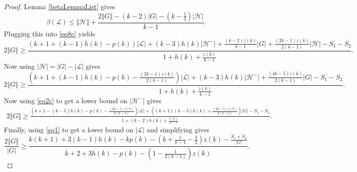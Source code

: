 \documentclass[10pt]{article}
\theoremstyle{plain}
\theoremstyle{definition}
\theoremstyle{remark}
\newcommand{\fancy}[1]{\mathcal{#1}}
\renewcommand{\L}{\fancy{L}}
\newcommand{\HH}{\fancy{H}}
\newcommand{\card}[1]{\left|#1\right|}
\newcommand{\size}[1]{\left\Vert#1\right\Vert}
\newcommand{\parens}[1]{\left( #1 \right)}
\begin{document}
\begin{proof}
Lemma \ref{betaLemmaList} gives
\[\beta(\L) \le \size{\HH} + \frac{2\size{G} - (k-2)\card{G} - \parens{k - \frac12}\card{\HH}}{k-1}.\]
Plugging this into \eqref{eq8c} yields
\begin{equation}\label{eq9c}
2\size{G} \ge \frac{\parens{k+1 +(k-1)h(k)- p(k)}\card{\L} + (k- 3)h(k)\card{\HH^-} +\frac{(k-2)z(k)}{k-1}\card{G} + \frac{(2k-1)z(k)}{2(k-1)}\card{\HH} - S_1 - S_2}{1 + h(k) + \frac{z(k)}{k-1}}.
\end{equation}
Now using $\card{\HH} = \card{G} - \card{\L}$ gives
\begin{equation}\label{eq10c}
2\size{G} \ge \frac{\parens{k+1 +(k-1)h(k)- p(k) - \frac{(2k-1)z(k)}{2(k-1)}}\card{\L} + (k- 3)h(k)\card{\HH^-} +\frac{(4k-5)z(k)}{2(k-1)}\card{G} - S_1- S_2}{1 + h(k) + \frac{z(k)}{k-1}}.
\end{equation}
Now using \eqref{eq2c} to get a lower bound on $\card{\HH^-}$ gives
\begin{equation}\label{eq11c}
\begin{align*}
2\size{G} \ge \frac{\parens{k+1 - (k-5)h(k)- p(k) - \frac{(2k-1)z(k)}{2(k-1)}}\card{\L}+\parens{(k+1)(k-3)h(k) + \frac{(4k-5)z(k)}{2(k-1)}}\card{G} - S_1- S_2}{1 + (k-2)h(k) + \frac{z(k)}{k-1}}.
\end{align*}
\end{equation}
Finally, using \eqref{eq1} to get a lower bound on $\card{\L}$ and simplifying gives
\begin{equation}\label{eq12}
\frac{2\size{G}}{\card{G}} \ge \frac{k(k+1) + 3(k-1)h(k) - kp(k) - \parens{k + \frac{1}{k-1} - \frac32}z(k) - \frac{S_1 + S_2}{\card{G}}}{k+2 + 3h(k) - p(k) - \parens{1 - \frac{1}{2(k-1)}}z(k)}.
\end{equation}
\end{proof}
\end{document}
